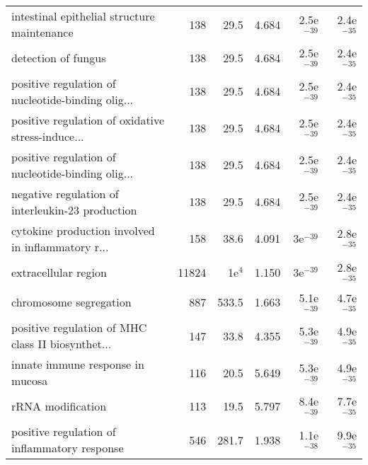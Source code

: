 \begin{longtable}{lrrrrr}
       intestinal epithelial structure maintenance &                     138 &                    29.5 &      4.684 &         2.5e$^{-39}$ &         2.4e$^{-35}$ \\
                               detection of fungus &                     138 &                    29.5 &      4.684 &         2.5e$^{-39}$ &         2.4e$^{-35}$ \\
 positive regulation of nucleotide-binding olig... &                     138 &                    29.5 &      4.684 &         2.5e$^{-39}$ &         2.4e$^{-35}$ \\
 positive regulation of oxidative stress-induce... &                     138 &                    29.5 &      4.684 &         2.5e$^{-39}$ &         2.4e$^{-35}$ \\
 positive regulation of nucleotide-binding olig... &                     138 &                    29.5 &      4.684 &         2.5e$^{-39}$ &         2.4e$^{-35}$ \\
  negative regulation of interleukin-23 production &                     138 &                    29.5 &      4.684 &         2.5e$^{-39}$ &         2.4e$^{-35}$ \\
 cytokine production involved in inflammatory r... &                     158 &                    38.6 &      4.091 &           3e$^{-39}$ &         2.8e$^{-35}$ \\
                              extracellular region &                   11824 &                1e$^{4}$ &      1.150 &           3e$^{-39}$ &         2.8e$^{-35}$ \\
                            chromosome segregation &                     887 &                   533.5 &      1.663 &         5.1e$^{-39}$ &         4.7e$^{-35}$ \\
 positive regulation of MHC class II biosynthet... &                     147 &                    33.8 &      4.355 &         5.3e$^{-39}$ &         4.9e$^{-35}$ \\
                  innate immune response in mucosa &                     116 &                    20.5 &      5.649 &         5.3e$^{-39}$ &         4.9e$^{-35}$ \\
                                 rRNA modification &                     113 &                    19.5 &      5.797 &         8.4e$^{-39}$ &         7.7e$^{-35}$ \\
      positive regulation of inflammatory response &                     546 &                   281.7 &      1.938 &         1.1e$^{-38}$ &         9.9e$^{-35}$ \\

\end{longtable}
